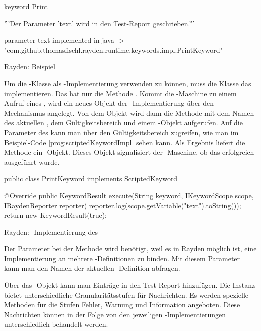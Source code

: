 \begin{program}
\begin{JavaCode}
keyword Print {
	'''Der Parameter 'text' wird in den Test-Report geschrieben.'''
	
	parameter text
	implemented in java -> "com.github.thomasfischl.rayden.runtime.keywords.impl.PrintKeyword"
}
\end{JavaCode}
\caption{Rayden: Beispiel }
\label{prog:scriptedKeyword}
\end{program}

\SuperPar
Um die -Klasse als -Implementierung verwenden zu können, muss die Klasse das   implementieren. Das  hat nur die Methode . Kommt die -Maschine zu einem Aufruf eines , wird ein neues Objekt der -Implementierung über den -Mechanismus angelegt. Von dem Objekt wird dann die Methode  mit dem Namen des aktuellen , dem Gültigkeitsbereich und einem -Objekt aufgerufen. Auf die Parameter des  kann man über den Gültigkeitsbereich zugreifen, wie man im Beispiel-Code \ref{prog:scriptedKeywordImpl} sehen kann. Als Ergebnis liefert die Methode ein -Objekt. Dieses Objekt signalisiert der -Maschine, ob das  erfolgreich ausgeführt wurde.   

\begin{program}
\begin{JavaCode}
public class PrintKeyword implements ScriptedKeyword {

	@Override
	public KeywordResult execute(String keyword, 
			IKeywordScope scope, IRaydenReporter reporter) {
		reporter.log(scope.getVariable("text").toString());
		return new KeywordResult(true);
	}
}
\end{JavaCode}
\caption{Rayden: -Implementierung des }
\label{prog:scriptedKeywordImpl}
\end{program}

\SuperPar
Der Parameter  bei der Methode  wird benötigt, weil es in Rayden möglich ist, eine Implementierung an mehrere -Definitionen zu binden. Mit diesem Parameter kann man den Namen der aktuellen -Definition abfragen.

\SuperPar
Über das -Objekt kann man Einträge in den Test-Report hinzufügen. Die Instanz bietet unterschiedliche Granularitätsstufen für Nachrichten. Es werden spezielle Methoden für die Stufen Fehler, Warnung und Information angeboten. Diese Nachrichten können in der Folge von den jeweiligen -Implementierungen unterschiedlich behandelt werden. 

